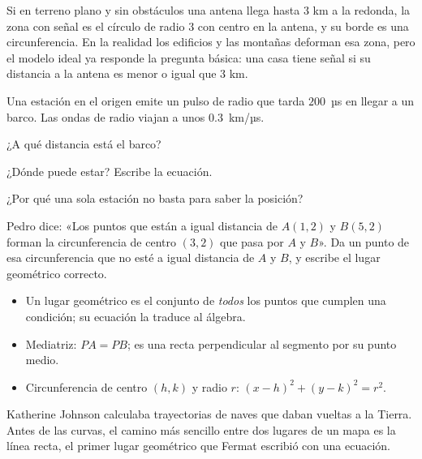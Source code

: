 \documentclass[11pt]{article}
\begin{document}
\begin{aplicacion}
Si en terreno plano y sin obstáculos una antena llega hasta $3$ km a la
redonda, la zona con señal es el círculo de radio $3$ con centro en la antena,
y su borde es una circunferencia. En la realidad los edificios y las montañas
deforman esa zona, pero el modelo ideal ya responde la pregunta básica: una casa
tiene señal si su distancia a la antena es menor o igual que $3$ km.
\end{aplicacion}

\begin{preguntas}
\pregunta Una estación en el origen emite un pulso de radio que tarda
$200$~µs en llegar a un barco. Las ondas de radio viajan a unos
$\num{0,3}$~km/µs.
\begin{opciones}
  \item ¿A qué distancia está el barco?
  \item ¿Dónde puede estar? Escribe la ecuación.
  \item ¿Por qué una sola estación no basta para saber la posición?
\end{opciones}
\espacio{3.5cm}
\pregunta Pedro dice: «Los puntos que están a igual distancia de $A(1, 2)$ y
$B(5, 2)$ forman la circunferencia de centro $(3, 2)$ que pasa por $A$ y
$B$». Da un punto de esa circunferencia que no esté a igual distancia de $A$ y
$B$, y escribe el lugar geométrico correcto.
\espacio{3.5cm}
\end{preguntas}

\begin{resumen}
\begin{itemize}
  \item Un lugar geométrico es el conjunto de \emph{todos} los puntos que
        cumplen una condición; su ecuación la traduce al álgebra.
  \item Mediatriz: $PA = PB$; es una recta perpendicular al segmento por su
        punto medio.
  \item Circunferencia de centro $(h, k)$ y radio $r$:
        $(x - h)^2 + (y - k)^2 = r^2$.
\end{itemize}
\end{resumen}

\label{tema:recta}

\begin{hilo}
Katherine Johnson calculaba trayectorias de naves que daban vueltas a la
Tierra. Antes de las curvas, el camino más sencillo entre dos lugares de un
mapa es la línea recta, el primer lugar geométrico que Fermat escribió con una
ecuación.
\end{hilo}
\end{document}
